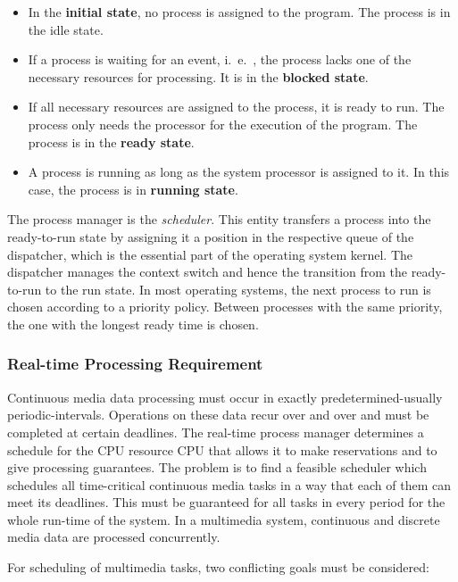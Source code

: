 \begin{multicols}{2}
	\begin{itemize}
		\item In the \textbf{initial state}, no process is assigned to the program. The process is in the idle state.
		\item If a process is waiting for an event, i.\ e.\ , the process lacks one of the necessary resources for processing. It is in the \textbf{blocked state}.
		\item If all necessary resources are assigned to the process, it is ready to run. The process only needs the processor for the execution of the program. The process is in the \textbf{ready state}.
		\item A process is running as long as the system processor is assigned to it. In this case, the process is in \textbf{running state}.
	\end{itemize}
\end{multicols}

 
The process manager is the \textit{scheduler}. This entity transfers a process into the ready-to-run state by assigning it a position in the respective queue of the dispatcher, which is the essential part of the operating system kernel. The dispatcher manages the context
switch and hence the transition from the ready-to-run to the run state. In most operating systems, the next process to run is chosen according to a priority policy. Between processes with the same priority, the one with the longest ready time is chosen.
	

\subsubsection{Real-time Processing Requirement}
Continuous media data processing must occur in exactly predetermined-usually periodic-intervals. Operations on these data recur over and over and must be completed at certain deadlines. The real-time process manager determines a schedule for the CPU resource CPU that allows it to make reservations and to give processing guarantees. The problem is to find a feasible scheduler which schedules all time-critical continuous media tasks in a way that each of them can meet its deadlines. This must be guaranteed for all tasks in every period for the whole run-time of the system. In a multimedia system, continuous and discrete media data are processed concurrently.

For scheduling of multimedia tasks, two conflicting goals must be considered:

